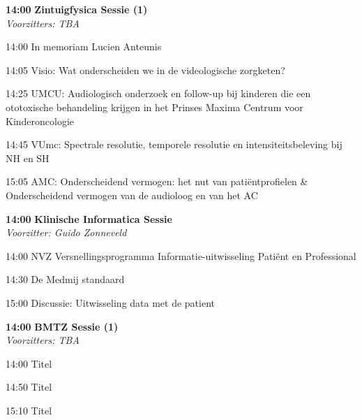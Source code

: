 \documentclass[a4paper,10pt]{report}
\begin{document}
\begin{multicols*}{3}
\vfill

\begin{packed_enum}
\item[\textbf{14:00}] \textbf{Zintuigfysica Sessie (1)}\\\textit{Voorzitters: TBA}
\item[14:00] In memoriam Lucien Anteunis 
\item[14:05] Visio: Wat onderscheiden we in de videologische zorg\-keten? 
\item[14:25] UMCU: Audiologisch onderzoek en follow-up bij kinderen die een ototoxische behandeling krijgen in het Prinses Maxima Centrum voor Kinderoncologie  
\item[14:45] VUmc: Spectrale resolutie, temporele resolutie en intensiteitsbeleving bij NH en SH 
\item[15:05] AMC: Onderscheidend vermogen: het nut van patiëntprofielen \&
Onderscheidend vermogen van de audioloog en van het AC
\end{packed_enum} %

\vfill

\begin{packed_enum}
\item[\textbf{14:00}] \textbf{Klinische Informatica Sessie }\\\textit{Voorzitter: Guido Zonneveld}
\item[14:00] NVZ Versnellingsprogramma Informatie-uitwisseling Pa\-tiënt en Professional 
\item[14:30] De Medmij standaard 
\item[15:00] Discussie: Uitwisseling data met de patient 
\end{packed_enum} %

\vfill

\begin{packed_enum}
\item[\textbf{14:00}] \textbf{BMTZ Sessie (1)}\\\textit{Voorzitters: TBA}
\item[14:00] Titel 
\item[14:50] Titel 
\item[15:10] Titel 
\end{packed_enum} %


\end{multicols*}
\end{document}
